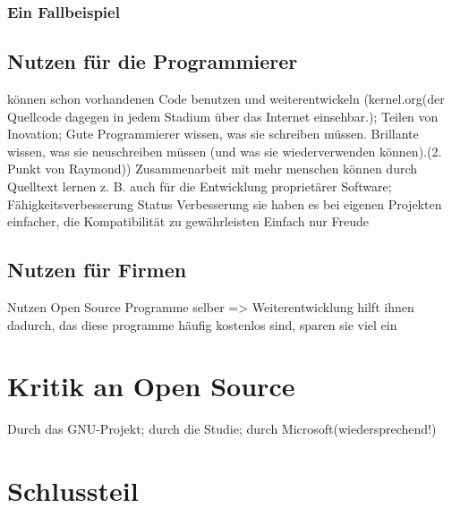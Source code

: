 \documentclass[a4paper,12pt]{article}
\begin{document}
\subsubsection{Ein Fallbeispiel}%
\subsection{Nutzen für die Programmierer}
können schon vorhandenen Code benutzen und weiterentwickeln (kernel.org(der Quellcode dagegen in jedem Stadium über das Internet einsehbar.); Teilen von Inovation; Gute Programmierer wissen, was sie schreiben müssen. Brillante wissen, was sie neuschreiben müssen (und was sie wiederverwenden können).(2. Punkt von Raymond))
Zusammenarbeit mit mehr menschen
können durch Quelltext lernen z. B. auch für die Entwicklung proprietärer Software; Fähigkeitsverbesserung
Status Verbesserung
sie haben es bei eigenen Projekten einfacher, die Kompatibilität zu gewährleisten
Einfach nur Freude
\subsection{Nutzen für Firmen}
Nutzen Open Source Programme selber => Weiterentwicklung hilft ihnen
dadurch, das diese programme häufig kostenlos sind, sparen sie viel ein
\section{Kritik an Open Source}%
Durch das GNU-Projekt; durch die Studie; durch Microsoft(wiedersprechend!)
\section{Schlussteil} %
\newpage
{}
\end{document}
